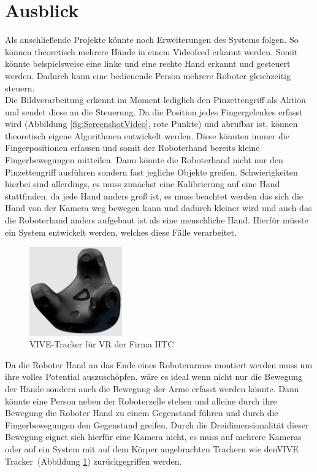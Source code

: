 \documentclass[a4paper,12pt,final]{article} %
\numberwithin{equation}{section} %
\numberwithin{figure}{section} %
\numberwithin{table}{section} %
\begin{document}
\section{Ausblick}
Als anschließende Projekte könnte noch Erweiterungen des Systems folgen. So können theoretisch mehrere Hände in einem Videofeed erkannt werden.
Somit könnte bei\-spiels\-weise eine linke und eine rechte Hand erkannt und gesteuert werden. Dadurch kann eine bedienende Person mehrere Roboter gleichzeitig steuern.\\ 
Die Bildverarbeitung erkennt im Moment lediglich den Pinzettengriff als Aktion und sendet diese an die Steuerung. Da die Position jedes Fingergelenkes erfasst wird (Ab\-bild\-ung \ref{fig:ScreenshotVideo}, rote Punkte) und abrufbar ist, können theoretisch eigene Algorithmen entwickelt werden.
Diese könnten immer die Fingerpositionen erfassen und somit der Roboterhand bereits kleine Fingerbewegungen mitteilen. Dann könnte die Roboterhand nicht nur den Pinzettengriff ausführen sondern fast jegliche Objekte greifen.
Schwierigkeiten hierbei sind allerdings, es muss zunächst eine Kalibrierung auf eine Hand stattfinden, da jede Hand anders groß ist, es muss beachtet werden das sich die Hand von der Kamera weg bewegen kann und dadurch kleiner wird und auch das die Roboterhand anders aufgebaut ist als eine menschliche Hand.
Hierfür müsste ein System entwickelt werden, welches diese Fälle verarbeitet.\\
\begin{figure}[H]
	\begin{center}
		\includegraphics[width=4cm]{Bilder/VIVE.png}
		\caption{VIVE-Tracker für VR der Firma HTC \cite{HTCvive}}
		\label{fig:VIVE}	
	\end{center}
\end{figure}
Da die Roboter Hand an das Ende eines Roboterarmes montiert werden muss um ihre volles Potential auszuschöpfen, wäre es ideal wenn nicht nur die Bewegung der Hände sondern auch die Bewegung der Arme erfasst werden könnte.
Dann könnte eine Person neben der Roboterzelle stehen und alleine durch ihre Bewegung die Roboter Hand zu einem Gegenstand führen und durch die Fingerbewegungen den Gegenstand greifen.
Durch die Dreidimensionalität dieser Bewegung eignet sich hierfür eine Kamera nicht, es muss auf mehrere Kameras oder auf ein System mit auf dem Körper angebrachten Trackern wie den\glqq VIVE Tracker\grqq\ (Abbildung \ref{fig:VIVE}) zurückgegriffen werden.
\newpage
{}
{} %
\printbibliography  %
\newpage
\end{document}
